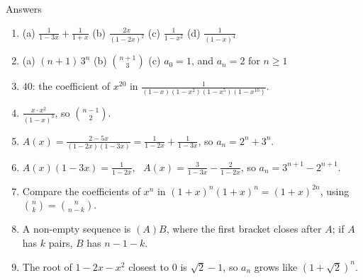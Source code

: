 \documentclass{wosm-slides}
\begin{document}
\begin{frame}{Answers}
  \small
  \begin{enumerate}
    \item (a) $\frac{1}{1-3x} + \frac{1}{1+x}$ \quad (b) $\frac{2x}{(1-2x)^2}$ \quad
      (c) $\frac{1}{1-x^2}$ \quad (d) $\frac{1}{(1-x)^4}$
    \item (a) $(n+1)\,3^n$ \quad (b) $\binom{n+1}{3}$ \quad (c) $a_0 = 1$, and $a_n = 2$ for $n \ge 1$
    \item $40$: the coefficient of $x^{20}$ in
      $\frac{1}{(1-x)(1-x^2)(1-x^5)(1-x^{10})}$.
    \item $\frac{x \cdot x^2}{(1-x)^3}$, so $\binom{n-1}{2}$.
    \item $A(x) = \frac{2 - 5x}{(1-2x)(1-3x)} = \frac{1}{1-2x} + \frac{1}{1-3x}$, so
      $a_n = 2^n + 3^n$.
    \item $A(x)(1 - 3x) = \frac{1}{1-2x}$, \ $A(x) = \frac{3}{1-3x} - \frac{2}{1-2x}$, so
      $a_n = 3^{n+1} - 2^{n+1}$.
    \item Compare the coefficients of $x^n$ in $(1+x)^n (1+x)^n = (1+x)^{2n}$, using
      $\binom{n}{k} = \binom{n}{n-k}$.
    \item A non-empty sequence is $(A)B$, where the first bracket closes after $A$; if $A$ has
      $k$ pairs, $B$ has $n - 1 - k$.
    \item The root of $1 - 2x - x^2$ closest to $0$ is $\sqrt2 - 1$, so $a_n$ grows like
      $(1 + \sqrt2)^n$.
  \end{enumerate}
\end{frame}

\end{document}
